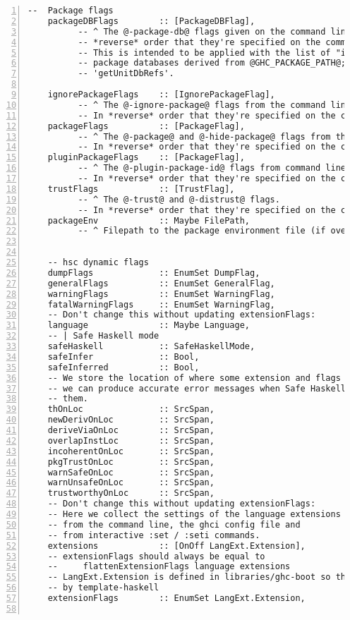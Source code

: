 \documentclass[en]{pracamgr}
\begin{document}
\begin{lstlisting}[numbers=left,stepnumber=1]
    --  Package flags
    packageDBFlags        :: [PackageDBFlag],
          -- ^ The @-package-db@ flags given on the command line, In
          -- *reverse* order that they're specified on the command line.
          -- This is intended to be applied with the list of "initial"
          -- package databases derived from @GHC_PACKAGE_PATH@; see
          -- 'getUnitDbRefs'.
  
    ignorePackageFlags    :: [IgnorePackageFlag],
          -- ^ The @-ignore-package@ flags from the command line.
          -- In *reverse* order that they're specified on the command line.
    packageFlags          :: [PackageFlag],
          -- ^ The @-package@ and @-hide-package@ flags from the command-line.
          -- In *reverse* order that they're specified on the command line.
    pluginPackageFlags    :: [PackageFlag],
          -- ^ The @-plugin-package-id@ flags from command line.
          -- In *reverse* order that they're specified on the command line.
    trustFlags            :: [TrustFlag],
          -- ^ The @-trust@ and @-distrust@ flags.
          -- In *reverse* order that they're specified on the command line.
    packageEnv            :: Maybe FilePath,
          -- ^ Filepath to the package environment file (if overriding default)
  
  
    -- hsc dynamic flags
    dumpFlags             :: EnumSet DumpFlag,
    generalFlags          :: EnumSet GeneralFlag,
    warningFlags          :: EnumSet WarningFlag,
    fatalWarningFlags     :: EnumSet WarningFlag,
    -- Don't change this without updating extensionFlags:
    language              :: Maybe Language,
    -- | Safe Haskell mode
    safeHaskell           :: SafeHaskellMode,
    safeInfer             :: Bool,
    safeInferred          :: Bool,
    -- We store the location of where some extension and flags were turned on so
    -- we can produce accurate error messages when Safe Haskell fails due to
    -- them.
    thOnLoc               :: SrcSpan,
    newDerivOnLoc         :: SrcSpan,
    deriveViaOnLoc        :: SrcSpan,
    overlapInstLoc        :: SrcSpan,
    incoherentOnLoc       :: SrcSpan,
    pkgTrustOnLoc         :: SrcSpan,
    warnSafeOnLoc         :: SrcSpan,
    warnUnsafeOnLoc       :: SrcSpan,
    trustworthyOnLoc      :: SrcSpan,
    -- Don't change this without updating extensionFlags:
    -- Here we collect the settings of the language extensions
    -- from the command line, the ghci config file and
    -- from interactive :set / :seti commands.
    extensions            :: [OnOff LangExt.Extension],
    -- extensionFlags should always be equal to
    --     flattenExtensionFlags language extensions
    -- LangExt.Extension is defined in libraries/ghc-boot so that it can be used
    -- by template-haskell
    extensionFlags        :: EnumSet LangExt.Extension,
  

\end{lstlisting}
\end{document}
